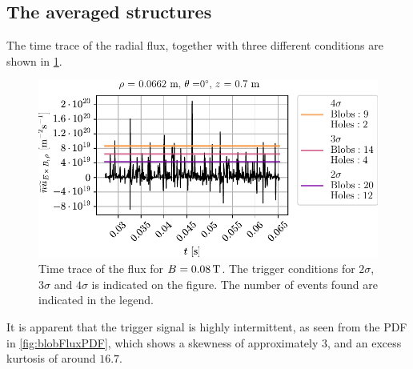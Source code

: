 \subsection{The averaged structures}
The time trace of the radial flux, together with three different conditions are shown in \cref{fig:blobFluxTT}.
%
\begin{figure}[htb]
    \begin{center}
        \includegraphics{fig/results/blobs/blobFluxTimeTrace_B0_008Tweak}
    \end{center}
    \caption{
        Time trace of the flux for $B=0.08\, \text{T}$.
        The trigger conditions for $2\sigma$, $3\sigma$ and $4\sigma$ is indicated on the figure.
        The number of events found are indicated in the legend.
    }
    \label{fig:blobFluxTT}
\end{figure}
%
It is apparent that the trigger signal is highly intermittent, as seen from the PDF in \cref{fig:blobFluxPDF}, which shows a skewness of approximately $3$, and an excess kurtosis of around $16.7$.
%
